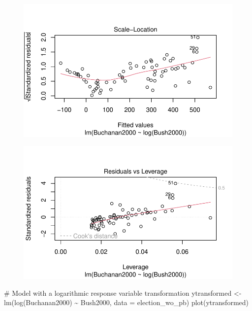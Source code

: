 \documentclass[
  letterpaper,
  DIV=11,
  numbers=noendperiod]{scrartcl}
\newenvironment{Shaded}{\begin{snugshade}}{\end{snugshade}}
\newcommand{\AttributeTok}[1]{\textcolor[rgb]{0.40,0.45,0.13}{#1}}
\newcommand{\CommentTok}[1]{\textcolor[rgb]{0.37,0.37,0.37}{#1}}
\newcommand{\FunctionTok}[1]{\textcolor[rgb]{0.28,0.35,0.67}{#1}}
\newcommand{\NormalTok}[1]{\textcolor[rgb]{0.00,0.23,0.31}{#1}}
\newcommand{\OtherTok}[1]{\textcolor[rgb]{0.00,0.23,0.31}{#1}}
\newcommand{\SpecialCharTok}[1]{\textcolor[rgb]{0.37,0.37,0.37}{#1}}
\begin{document}
\begin{figure}[H]

{\centering \includegraphics{case_study_1_files/figure-pdf/unnamed-chunk-4-9.pdf}

}

\end{figure}

\begin{figure}[H]

{\centering \includegraphics{case_study_1_files/figure-pdf/unnamed-chunk-4-10.pdf}

}

\end{figure}

\begin{Shaded}
\begin{Highlighting}[]
\CommentTok{\# Model with a logarithmic response variable transformation}
\NormalTok{ytransformed }\OtherTok{\textless{}{-}} \FunctionTok{lm}\NormalTok{(}\FunctionTok{log}\NormalTok{(Buchanan2000) }\SpecialCharTok{\textasciitilde{}}\NormalTok{ Bush2000, }\AttributeTok{data =}\NormalTok{ election\_wo\_pb)}
\FunctionTok{plot}\NormalTok{(ytransformed)}
\end{Highlighting}
\end{Shaded}
\end{document}

